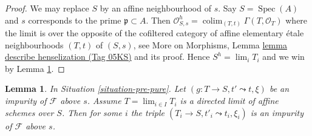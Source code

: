 \documentclass{amsart}
\theoremstyle{plain}
\newtheorem{lemma}[subsection]{Lemma}
\theoremstyle{definition}
\theoremstyle{remark}
\numberwithin{equation}{subsection}
\def\lim{\mathop{\mathrm{lim}}\nolimits}
\def\colim{\mathop{\mathrm{colim}}\nolimits}
\def\Spec{\mathop{\mathrm{Spec}}}
\begin{document}
\begin{proof}
We may replace $S$ by an affine neighbourhood of $s$.
Say $S = \Spec(A)$ and $s$ corresponds to the prime
$\mathfrak p \subset A$. Then
$\mathcal{O}_{S, s}^h = \colim_{(T, t)} \Gamma(T, \mathcal{O}_T)$
where the limit is over the opposite of the
cofiltered category of affine elementary \'etale neighbourhoods
$(T, t)$ of $(S, s)$, see
More on Morphisms,
Lemma \href{https://stacks.math.columbia.edu/tag/05KS}{lemma describe henselization (Tag 05KS)}
and its proof. Hence $S^h = \lim_i T_i$ and we win by
Lemma \ref{lemma-impure-limit}.
\end{proof}


\begin{lemma}
\label{lemma-impure-limit}
In Situation \ref{situation-pre-pure}.
Let $(g : T \to S, t' \leadsto t, \xi)$ be an impurity of
$\mathcal{F}$ above $s$. Assume $T = \lim_{i \in I} T_i$
is a directed limit of affine schemes over $S$. Then for
some $i$ the triple $(T_i \to S, t'_i \leadsto t_i, \xi_i)$
is an impurity of $\mathcal{F}$ above $s$.
\end{lemma}
\end{document}
